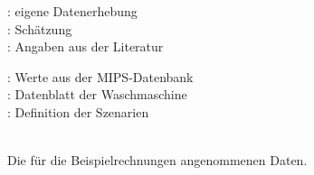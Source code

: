 \begin{table}
    \begin{minipage}[t]{6cm}
        \scriptsize
        \sourceE: eigene Datenerhebung  \\
        \sourceS: Schätzung \\
        \sourceL: Angaben aus der Literatur \\
    \end{minipage}
    \hfill
    \begin{minipage}[t]{6cm}
        \scriptsize
        \sourceM: Werte aus der MIPS-Datenbank\\
        \sourceW: Datenblatt der Waschmaschine\\
        \sourceD: Definition der Szenarien\\
    \end{minipage}\\
    \caption{Die für die Beispielrechnungen angenommenen Daten.}
\end{table}
%
